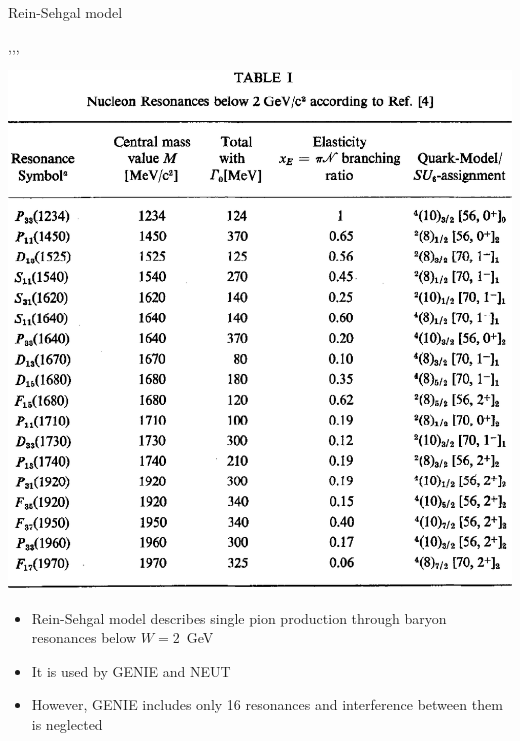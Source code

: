 \begin{wideslide}{Rein-Sehgal model}
\null\vfill

  \twocolumn
  {
    \sep\sep\sep
 
    \centering\includegraphics[width=\columnwidth]{figures/rein.eps}
  }
  {
    \centering
    \begin{itemize}
     \item Rein-Sehgal model describes single pion production through baryon resonances below $W = 2$~GeV
     \item It is used by GENIE and NEUT
     \item However, GENIE includes only 16 resonances and interference between them is neglected
    \end{itemize}
  }	

\vfill\null
\end{wideslide}

